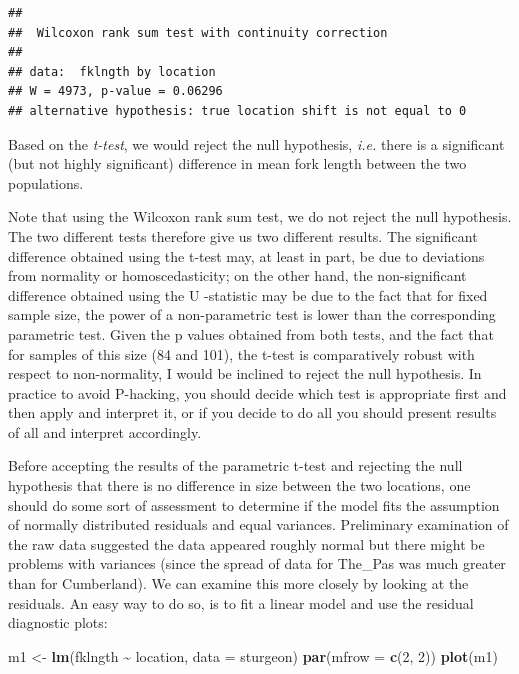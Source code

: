 \documentclass[
  12pt,
]{book}
\newenvironment{Shaded}{\begin{snugshade}}{\end{snugshade}}
\newcommand{\DataTypeTok}[1]{\textcolor[rgb]{0.13,0.29,0.53}{#1}}
\newcommand{\DecValTok}[1]{\textcolor[rgb]{0.00,0.00,0.81}{#1}}
\newcommand{\KeywordTok}[1]{\textcolor[rgb]{0.13,0.29,0.53}{\textbf{#1}}}
\newcommand{\NormalTok}[1]{#1}
\newcommand{\OperatorTok}[1]{\textcolor[rgb]{0.81,0.36,0.00}{\textbf{#1}}}
\newcommand{\StringTok}[1]{\textcolor[rgb]{0.31,0.60,0.02}{#1}}
\begin{document}
\begin{verbatim}
## 
##  Wilcoxon rank sum test with continuity correction
## 
## data:  fklngth by location
## W = 4973, p-value = 0.06296
## alternative hypothesis: true location shift is not equal to 0
\end{verbatim}

Based on the \emph{t-test}, we would reject the null hypothesis, \emph{i.e.} there is a significant (but not highly significant) difference in mean fork length between the two populations.

Note that using the Wilcoxon rank sum test, we do not reject the null hypothesis. The two different tests therefore give us two different results. The significant difference obtained using the t-test may, at least in part, be due to deviations from normality or homoscedasticity; on the other hand, the non-significant difference obtained using the U -statistic may be due to the fact that for fixed sample size, the power of a non-parametric test is lower than the corresponding parametric test. Given the p values obtained from both tests, and the fact that for samples of this size (84 and 101), the t-test is comparatively robust with respect to non-normality, I would be inclined to reject the null hypothesis. In practice to avoid P-hacking, you should decide which test is appropriate first and then apply and interpret it, or if you decide to do all you should present results of all and interpret accordingly.

Before accepting the results of the parametric t-test and rejecting the null hypothesis that there is no difference in size between the two locations, one should do some sort of assessment to determine if the model fits the assumption of normally distributed residuals and equal variances. Preliminary examination of the raw data suggested the data appeared roughly normal but there might be problems with variances (since the spread of data for The\_Pas was much greater than for Cumberland). We can examine this more closely by looking at the residuals. An easy way to do so, is to fit a linear model and use the residual diagnostic plots:

\begin{Shaded}
\begin{Highlighting}[]
\NormalTok{m1 \textless{}{-}}\StringTok{ }\KeywordTok{lm}\NormalTok{(fklngth }\OperatorTok{\textasciitilde{}}\StringTok{ }\NormalTok{location, }\DataTypeTok{data =}\NormalTok{ sturgeon)}
\KeywordTok{par}\NormalTok{(}\DataTypeTok{mfrow =} \KeywordTok{c}\NormalTok{(}\DecValTok{2}\NormalTok{, }\DecValTok{2}\NormalTok{))}
\KeywordTok{plot}\NormalTok{(m1)}
\end{Highlighting}
\end{Shaded}
\end{document}
